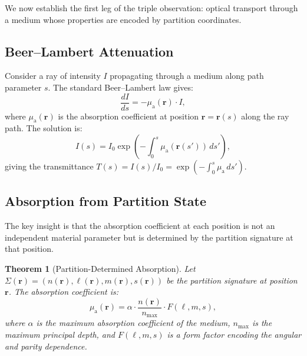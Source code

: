\documentclass[11pt,twocolumn,a4paper]{article}
\newtheorem{theorem}{Theorem}[section]
\newcommand{\muabs}{\mu_{\mathrm{a}}}
\begin{document}
We now establish the first leg of the triple observation: optical
transport through a medium whose properties are encoded by partition
coordinates.

\subsection{Beer--Lambert Attenuation}

Consider a ray of intensity $I$ propagating through a medium along
path parameter $s$. The standard Beer--Lambert law
\citep{beer1852,lambert1760} gives:
\begin{equation}
\frac{dI}{ds} = -\muabs(\mathbf{r}) \cdot I,
\label{eq:beer-lambert}
\end{equation}
where $\muabs(\mathbf{r})$ is the absorption coefficient at position
$\mathbf{r} = \mathbf{r}(s)$ along the ray path. The solution is:
\begin{equation}
I(s) = I_0 \exp\!\left(-\int_0^s \muabs(\mathbf{r}(s'))\,ds'\right),
\label{eq:beer-lambert-solution}
\end{equation}
giving the transmittance $T(s) = I(s)/I_0 = \exp(-\int_0^s \muabs\,ds')$.

\subsection{Absorption from Partition State}

The key insight is that the absorption coefficient at each position is
not an independent material parameter but is determined by the
partition signature at that position.

\begin{theorem}[Partition-Determined Absorption]
\label{thm:partition-absorption}
Let $\Sigma(\mathbf{r}) = (n(\mathbf{r}), \ell(\mathbf{r}),
m(\mathbf{r}), s(\mathbf{r}))$ be the partition signature at position
$\mathbf{r}$. The absorption coefficient is:
\begin{equation}
\muabs(\mathbf{r}) = \alpha \cdot \frac{n(\mathbf{r})}{n_{\max}} \cdot
  F(\ell, m, s),
\label{eq:mu-from-partition}
\end{equation}
where $\alpha$ is the maximum absorption coefficient of the medium,
$n_{\max}$ is the maximum principal depth, and $F(\ell, m, s)$ is a
form factor encoding the angular and parity dependence.
\end{theorem}
\end{document}
